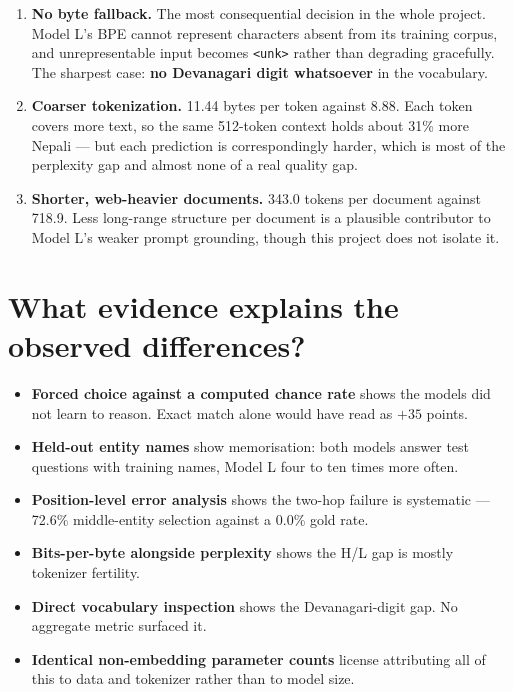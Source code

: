 \documentclass[11pt]{report}
\newcommand{\p}[1]{\texttt{#1}}
\begin{document}
\begin{enumerate}[leftmargin=*]
\item \textbf{No byte fallback.} The most consequential decision in the whole
      project. Model L's BPE cannot represent characters absent from its
      training corpus, and unrepresentable input becomes \p{<unk>} rather than
      degrading gracefully. The sharpest case: \textbf{no Devanagari digit
      whatsoever} in the vocabulary.
\item \textbf{Coarser tokenization.} 11.44 bytes per token against 8.88. Each
      token covers more text, so the same 512-token context holds about 31\%
      more Nepali --- but each prediction is correspondingly harder, which is
      most of the perplexity gap and almost none of a real quality gap.
\item \textbf{Shorter, web-heavier documents.} 343.0 tokens per document against
      718.9. Less long-range structure per document is a plausible contributor
      to Model L's weaker prompt grounding, though this project does not isolate
      it.
\end{enumerate}

\section{What evidence explains the observed differences?}

\begin{itemize}[leftmargin=*]
\item \textbf{Forced choice against a computed chance rate} shows the models did
      not learn to reason. Exact match alone would have read as $+35$ points.
\item \textbf{Held-out entity names} show memorisation: both models answer test
      questions with training names, Model L four to ten times more often.
\item \textbf{Position-level error analysis} shows the two-hop failure is
      systematic --- 72.6\% middle-entity selection against a 0.0\% gold rate.
\item \textbf{Bits-per-byte alongside perplexity} shows the H/L gap is mostly
      tokenizer fertility.
\item \textbf{Direct vocabulary inspection} shows the Devanagari-digit gap. No
      aggregate metric surfaced it.
\item \textbf{Identical non-embedding parameter counts} license attributing all
      of this to data and tokenizer rather than to model size.
\end{itemize}
\end{document}
